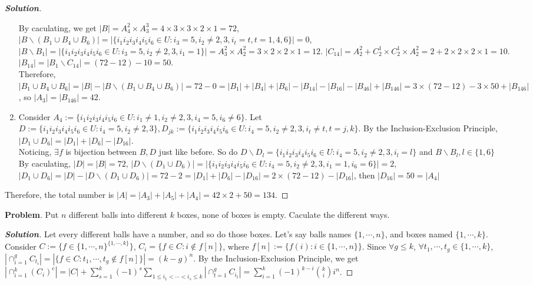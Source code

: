 \documentclass{ctexart}
\newcounter{problem}
\renewcommand{\theproblem}{\Roman{problem}}
\newenvironment{problem}{\refstepcounter{problem}\noindent\color{blue}\textbf{Problem}\theproblem.}{}
\newenvironment{solution}{\begin{proof}[\textbf{Solution}]}{\end{proof}}
\renewcommand{\(}{\left(}
\renewcommand{\)}{\right)}
\newcommand{\Cb}[2]{\binom{#1}{#2}}
\newcommand{\minus}{\mathbin{\backslash}}
\begin{document}
\begin{solution}
\begin{enumerate}
		By caculating, we get $|B|=A_{4}^2\times A_{3}^3=4\times 3\times 3\times 2\times1=72$, $|B\minus(B_1\cup B_4\cup B_6)|=|\{i_1i_2i_3i_4i_5i_6\in U: i_3=5,i_2\neq 2,3, i_t= t, t=1,4,6\}|=0$, $|B\minus B_1|=|\{i_1i_2i_3i_4i_5i_6\in U: i_3=5,i_2\neq 2,3, i_1= 1\}|=A_3^2\times A_2^2=3\times2\times2\times 1=12$. $|C_{14}|=A_2^2+C_2^1\times C_2^1\times A_2^2=2+2\times2\times2\times1=10$. $|B_{14}|=|B_{1}\minus C_{14}|=(72-12)-10=50$. \\
		Therefore, $|B_1\cup B_4\cup B_6|=|B|-|B\minus(B_1\cup B_4\cup B_6)|=72-0=|B_1|+|B_4|+|B_6|-|B_{14}|-|B_{16}|-|B_{46}|+|B_{146}|=3\times(72-12)-3\times50+|B_{146}|$, so $|A_3|=|B_{146}|=42$. 
		\item Consider $A_{4}:=\{i_1i_2i_3i_4i_5i_6\in U: i_1\neq 1, i_2\neq 2,3,i_4=5,i_6\neq 6\}$. Let $D:=\{i_1i_2i_3i_4i_5i_6\in U: i_4=5,i_2\neq 2,3 \}, D_{jk}:=\{i_1i_2i_3i_4i_5i_6\in U: i_4=5,i_2\neq 2,3, i_t\neq t, t=j,k\}.$ By the Inclusion-Exclusion Principle, $|D_1\cup D_6|=|D_1|+|D_6|-|D_{16}|$. \\
		Noticing, $\exists f$ is bijection between $B,D$ just like before. So do $D\minus D_{l}=\{i_1i_2i_3i_4i_5i_6\in U: i_4=5,i_2\neq 2,3, i_l= l\}$ and $B\minus B_{l}, l\in\{1,6\}$\\
		By caculating, $|D|=|B|=72$, $|D\minus (D_1\cup D_6)|=|\{i_1i_2i_3i_4i_5i_6\in U: i_4=5,i_2\neq 2,3, i_1= 1, i_6=6\}|=2$, $|D_1\cup D_6|=|D|-|D\minus (D_1\cup D_6)|=72-2=|D_{1}|+|D_{6}|-|D_{16}|=2\times(72-12)-|D_{16}|$, then $|D_{16}|=50=|A_4|$
		\end{enumerate}
		Therefore, the total number is $|A|=|A_3|+|A_5|+|A_4|=42\times2+50=134$.
\end{solution}


\begin{problem}
    Put $n$ different balls into different $k$ boxes, none of boxes is empty. Caculate the different ways.
\end{problem}
\begin{solution}
	\iffalse Consider $C:= \{1,\cdots,n\}^{\{1,\cdots,k\}}$,  $C_i=\{f\in C: |f[n]|=i\}$, where $f[n]:=\{f(i):i\in \{1,\cdots,n\}\}$, $A_i=\{f\in \{1,\cdots,n\}^{\{1,\cdots,i\}}:|f[n]|=i\}, i\in \mathbb{N}$. So $|C|=\sum_{i=1}^k C_k^i |A_i|=n^k$.\fi
	Let every different balls have a number, and so do those boxes. Let's say balls names $\{1,\cdots,n\}$, and boxes named $\{1,\cdots,k\}$.
	Consider $C:=\{f\in \{1,\cdots,n\}^{\{1,\cdots,k\}}\}$,  $C_i=\{f\in C: i\notin f[n]\}$, where $f[n]:=\{f(i):i\in \{1,\cdots,n\}\}$. Since $\forall g\leq k$, $\forall t_1,\cdots, t_g\in \{1,\cdots,k\}$, $|\cap_{i=1}^gC_{t_i}|=|\{f\in C: t_1,\cdots, t_g\notin f[n]\}|=(k-g)^n$. By the Inclusion-Exclusion Principle, we get $|\cap_{i=1}^{k}(C_i)^c|=|C|+\sum_{s=1}^k(-1)^s\sum_{1\leq i_1<\cdots<i_s\leq k}|\cap_{t=1}^gC_{i_t}|=\sum_{i=1}^{k}(-1)^{k-i}\Cb{k}{i}i^n$.

\end{solution}
\end{document}

